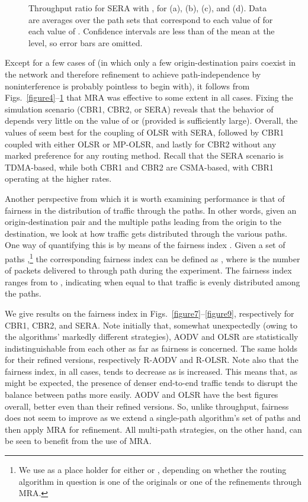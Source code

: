 \documentclass{article}
\begin{document}
\begin{figure}[p]
\centering
{}
\caption{Throughput ratio for SERA with , for  (a), 
(b),  (c), and  (d). Data are averages over the 
path sets that correspond to each value of  for each value of .
Confidence intervals are less than  of the mean at the  level, so
error bars are omitted.}
\label{figure6}
\end{figure}

Except for a few cases of  (in which only a few origin-destination
pairs coexist in the network and therefore refinement to achieve
path-independence by noninterference is probably pointless to begin with), it
follows from Figs.~\ref{figure4}--\ref{figure6} that MRA was effective to some
extent in all cases. Fixing the simulation scenario (CBR1, CBR2, or SERA)
reveals that the behavior of  depends very little on the value of
 or  (provided  is sufficiently large). Overall, the
values of  seem best for the coupling of OLSR with SERA, followed by
CBR1 coupled with either OLSR or MP-OLSR, and lastly for CBR2 without any marked
preference for any routing method. Recall that the SERA scenario is TDMA-based,
while both CBR1 and CBR2 are CSMA-based, with CBR1 operating at the higher
rates.

Another perspective from which it is worth examining performance is that of
fairness in the distribution of traffic through the paths. In other words, given
an origin-destination pair and the multiple paths leading from the origin to the
destination, we look at how traffic gets distributed through the various paths.
One way of quantifying this is by means of the fairness index \cite{Jain1998}.
Given a set of paths ,\footnote{We use  as a place
holder for either  or , depending on
whether the routing algorithm in question is one of the originals or one of the
refinements through MRA.} the corresponding fairness index can be defined as
,
where  is the number of packets delivered to  through path  during
the experiment. The fairness index ranges from  to ,
indicating when equal to  that traffic is evenly distributed among the paths.

We give results on the fairness index in Figs.~\ref{figure7}--\ref{figure9},
respectively for CBR1, CBR2, and SERA. Note initially that, somewhat
unexpectedly (owing to the algorithms' markedly different strategies), AODV and
OLSR are statistically indistinguishable from each other as far as fairness is
concerned. The same holds for their refined versions, respectively R-AODV and
R-OLSR. Note also that the fairness index, in all cases, tends to decrease as
 is increased. This means that, as might be expected, the presence of
denser end-to-end traffic tends to disrupt the balance between paths more
easily. AODV and OLSR have the best figures overall, better even than their
refined versions. So, unlike throughput, fairness does not seem to improve as we
extend a single-path algorithm's set of paths and then apply MRA for refinement.
All multi-path strategies, on the other hand, can be seen to benefit from the
use of MRA.
\end{document}
